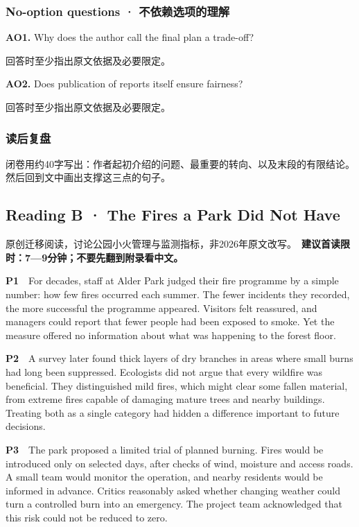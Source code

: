 \documentclass[
  11pt,
]{ctexart}
\begin{document}
\subsubsection{No-option questions ·
不依赖选项的理解}\label{no-option-questions-ux4e0dux4f9dux8d56ux9009ux9879ux7684ux7406ux89e3}

\textbf{AO1.} Why does the author call the final plan a trade-off?

回答时至少指出原文依据及必要限定。

\textbf{AO2.} Does publication of reports itself ensure fairness?

回答时至少指出原文依据及必要限定。

\subsubsection{读后复盘}\label{ux8bfbux540eux590dux76d8}

闭卷用约40字写出：作者起初介绍的问题、最重要的转向、以及末段的有限结论。然后回到文中画出支撑这三点的句子。

\subsection{Reading B · The Fires a Park Did Not
Have}\label{reading-b-the-fires-a-park-did-not-have}

原创迁移阅读，讨论公园小火管理与监测指标，非2026年原文改写。　\textbf{建议首读限时：7---9分钟；不要先翻到附录看中文。}

\textbf{P1}　For decades, staff at Alder Park judged their fire
programme by a simple number: how few fires occurred each summer. The
fewer incidents they recorded, the more successful the programme
appeared. Visitors felt reassured, and managers could report that fewer
people had been exposed to smoke. Yet the measure offered no information
about what was happening to the forest floor.

\textbf{P2}　A survey later found thick layers of dry branches in areas
where small burns had long been suppressed. Ecologists did not argue
that every wildfire was beneficial. They distinguished mild fires, which
might clear some fallen material, from extreme fires capable of damaging
mature trees and nearby buildings. Treating both as a single category
had hidden a difference important to future decisions.

\textbf{P3}　The park proposed a limited trial of planned burning. Fires
would be introduced only on selected days, after checks of wind,
moisture and access roads. A small team would monitor the operation, and
nearby residents would be informed in advance. Critics reasonably asked
whether changing weather could turn a controlled burn into an emergency.
The project team acknowledged that this risk could not be reduced to
zero.
\end{document}
